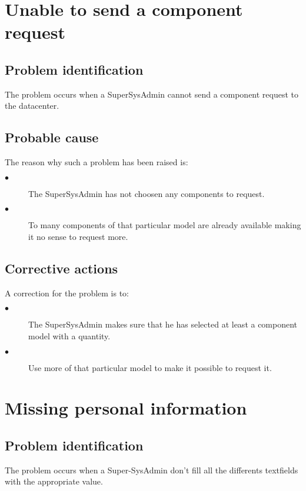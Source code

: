 \section{Unable to send a component request}

\subsection{Problem identification}
The problem occurs when a SuperSysAdmin cannot send a component request to the
datacenter.

\subsection{Probable cause}

The reason why such a problem has been raised is:\\
\begin{description}
\item[$\bullet$] The SuperSysAdmin has not choosen any components to request.
\item[$\bullet$] To many components of that particular model are already
available making it no sense to request more.
\end{description}


\subsection{Corrective actions}

A correction for the problem is to:\\
\begin{description}
\item[$\bullet$] The SuperSysAdmin makes sure that he has selected at least a
component model with a quantity.
\item[$\bullet$] Use more of that particular model to make it possible to
request it.
\end{description}







\section{Missing personal information} 

\subsection{Problem identification}
The problem occurs when a Super-SysAdmin don't fill all the differents
textfields with the appropriate value.
